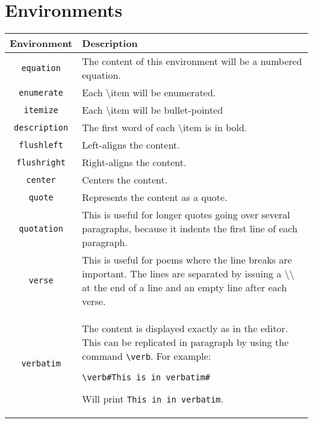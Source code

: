 \section{Environments}
\begin{tabular}{|c|p{8.9cm}|}
\hline

\textbf{Environment} & \textbf{Description}

\\
\hline
\verb£equation£ & The content of this environment will be a numbered equation.

\\
\hline
\verb£enumerate£ & Each \textbackslash{}item will be enumerated.

\\
\hline
\verb£itemize£ & Each \textbackslash{}item will be bullet-pointed

\\
\hline
\verb£description£ & The first word of each \textbackslash{}item is in bold.

\\
\hline
\verb£flushleft£ & Left-aligns the content.

\\
\hline
\verb£flushright£ & Right-aligns the content.

\\
\hline
\verb£center£ & Centers the content.

\\
\hline
\verb£quote£ & Represents the content as a quote.

\\
\hline
\verb£quotation£ & This is useful for longer quotes going over several paragraphs, because it indents the first line of each paragraph.

\\
\hline
\verb£verse£ & This is useful for poems where the line breaks are important. The lines are separated by issuing a \textbackslash{}\textbackslash{} at the end of a line and an empty line after each verse.

\\
\hline
\verb£verbatim£ & The content is displayed exactly as in the editor. This can be replicated in paragraph by using the command \verb£\verb£.
For example:

\verb£\verb#This is in verbatim#£

Will print \verb£This in in verbatim£.
\\
\hline
\end{tabular}